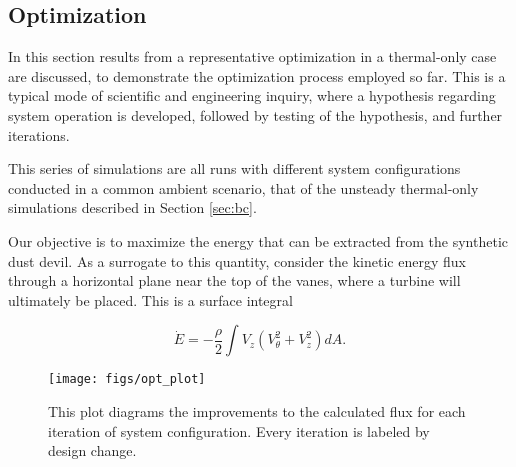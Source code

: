 \subsection{Optimization}

In this section results from a representative optimization
in a thermal-only case are discussed, to demonstrate the optimization 
process employed so far. This is a typical mode of scientific and
engineering inquiry, where a hypothesis regarding system operation is
developed, followed by testing of the hypothesis, and further
iterations.  

This series of simulations are all runs with different system
configurations conducted in a common ambient scenario, that of the
unsteady thermal-only simulations described in Section \ref{sec:bc}. 

Our objective is to maximize the energy that can be 
extracted from the synthetic dust devil. As a surrogate to this
quantity, consider the kinetic energy flux through a horizontal plane
near the top of the vanes, where a turbine will ultimately be
placed. This is a surface integral\cite{landau1959fm}


 \begin{equation}
 \dot E = -\frac{\rho }{2} \int V_z (V_{\theta}^2 + V_z^2 ) dA.
 \end{equation}

\begin{figure}[htb]
 \centering
 \texttt{[image: figs/opt\_plot]}
 \caption{This plot diagrams the improvements to the calculated flux for  
 each iteration of system configuration. Every iteration is labeled by
 design change.}
 \label{fig:opt_plot}
\end{figure}




